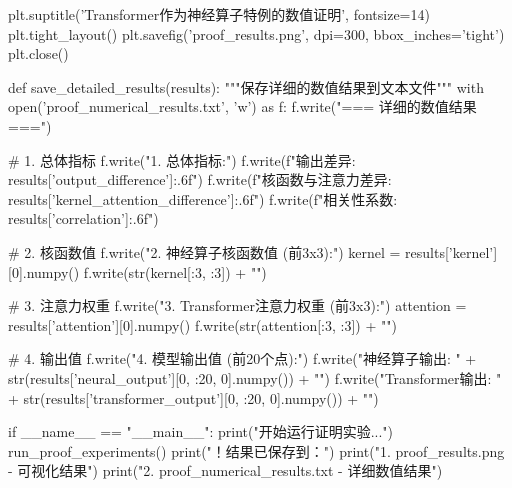 \documentclass{MMCStyle}
\begin{document}
\begin{python}
    plt.suptitle('Transformer作为神经算子特例的数值证明', fontsize=14)
    plt.tight_layout()
    plt.savefig('proof_results.png', dpi=300, bbox_inches='tight')
    plt.close()

def save_detailed_results(results):
    """保存详细的数值结果到文本文件"""
    with open('proof_numerical_results.txt', 'w') as f:
        f.write("=== 详细的数值结果 ===\n\n")
        
        # 1. 总体指标
        f.write("1. 总体指标:\n")
        f.write(f"输出差异: {results['output_difference']:.6f}\n")
        f.write(f"核函数与注意力差异: {results['kernel_attention_difference']:.6f}\n")
        f.write(f"相关性系数: {results['correlation']:.6f}\n\n")
        
        # 2. 核函数值
        f.write("2. 神经算子核函数值 (前3x3):\n")
        kernel = results['kernel'][0].numpy()
        f.write(str(kernel[:3, :3]) + "\n\n")
        
        # 3. 注意力权重
        f.write("3. Transformer注意力权重 (前3x3):\n")
        attention = results['attention'][0].numpy()
        f.write(str(attention[:3, :3]) + "\n\n")
        
        # 4. 输出值
        f.write("4. 模型输出值 (前20个点):\n")
        f.write("神经算子输出: " + 
                str(results['neural_output'][0, :20, 0].numpy()) + "\n")
        f.write("Transformer输出: " + 
                str(results['transformer_output'][0, :20, 0].numpy()) + "\n")

if __name__ == "__main__":
    print("开始运行证明实验...")
    run_proof_experiments()
    print("！结果已保存到：")
    print("1. proof_results.png - 可视化结果")
    print("2. proof_numerical_results.txt - 详细数值结果")
 \end{python}
 
\end{document}
